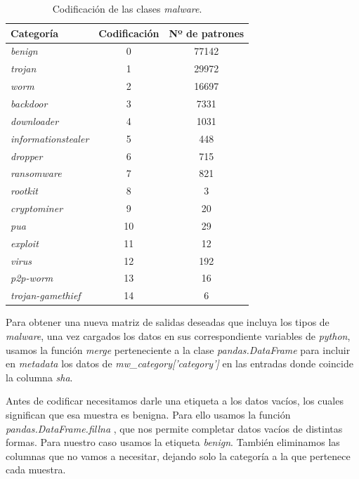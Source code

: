 \begin{table}[th]
	\centering
	\begin{tabular}{ |m{4cm}|c|c| }
		\hline
		\rowcolor{LightCyan}
		Categoría                   & Codificación & Nº de patrones \\
		\hline
		\textit{benign}             & 0            & 77142 \\
		\textit{trojan}             & 1            & 29972 \\
		\textit{worm}               & 2            & 16697 \\
		\textit{backdoor}           & 3            & 7331  \\
		\textit{downloader}         & 4            & 1031  \\
		\textit{informationstealer} & 5            & 448   \\
		\textit{dropper}            & 6            & 715   \\
		\textit{ransomware}         & 7            & 821   \\
		\textit{rootkit}            & 8            & 3     \\
		\textit{cryptominer}        & 9            & 20    \\
		\textit{pua}                & 10           & 29    \\
		\textit{exploit}            & 11           & 12    \\
		\textit{virus}              & 12           & 192   \\
		\textit{p2p-worm}           & 13           & 16    \\
		\textit{trojan-gamethief}   & 14           & 6     \\
		\hline
	\end{tabular}
	\caption{Codificación de las clases \textit{malware}.}
	\label{tabla:codificacion_malware}
\end{table}

Para obtener una nueva matriz de salidas deseadas que incluya los tipos de \textit{malware}, una vez cargados los datos en sus correspondiente variables de \textit{python}, usamos la función \textit{merge} \cite{merge} perteneciente a la clase \textit{pandas.DataFrame} para incluir en \textit{metadata} los datos de \textit{mw\_category['category']} en las entradas donde coincide la columna \textit{sha}.

\vspace{1em}

Antes de codificar necesitamos darle una etiqueta a los datos vacíos, los cuales significan que esa muestra es benigna. Para ello usamos la función \textit{pandas.DataFrame.fillna} \cite{fillna}, que nos permite completar datos vacíos de distintas formas. Para nuestro caso usamos la etiqueta \textit{benign}. También eliminamos las columnas que no vamos a necesitar, dejando solo la categoría a la que pertenece cada muestra.

